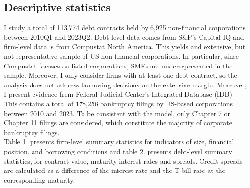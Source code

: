 \documentclass[12pt]{article}
\begin{document}
\subsection{Descriptive statistics \label{sec:descriptive stats}}
I study a total of 113,774 debt contracts held by 6,925 non-financial corporations between 2010Q1 and 2023Q2. Debt-level data comes from S\&P's Capital IQ and firm-level data is from Compustat North America. This yields and extensive, but not representative sample of US non-financial corporations. In particular, since Compustat focuses on listed corporations, SMEs are underrepresented in the sample. Moreover, I only consider firms with at least one debt contract, so the analysis does not address borrowing decisions on the extensive margin. Moreover, I present evidence from Federal Judicial Center's Integrated Database (IDB). This contains a total of 178,256 bankruptcy filings by US-based corporations between 2010 and 2023. To be consistent with the model, only Chapter 7 or Chapter 11 filings are considered, which constitute the majority of corporate bankruptcy filings. \vspace{3mm} \\
Table 1. presents firm-level summary statistics for indicators of size, financial position, and borrowing conditions and table 2. presents debt-level summary statistics, for contract value, maturity interest rates and spreads. Credit spreads are calculated as a difference of the interest rate and the T-bill rate at the corresponding maturity.
\end{document}
